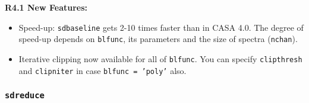 \medskip
{\bf R4.1 New Features:}\\
\begin{itemize}
\item Speed-up: {\tt sdbaseline} gets 2-10 times faster than in CASA 4.0. The degree of speed-up depends on {\tt blfunc}, its parameters and the size of spectra ({\tt nchan}).
\item Iterative clipping now available for all of {\tt blfunc}. You can specify {\tt clipthresh} and {\tt clipniter} in case {\tt blfunc = 'poly'} also. 
\end{itemize}


\subsubsection{{\tt sdreduce}}
\label{section:sd.sdtasks.tasks.sdreduce}

